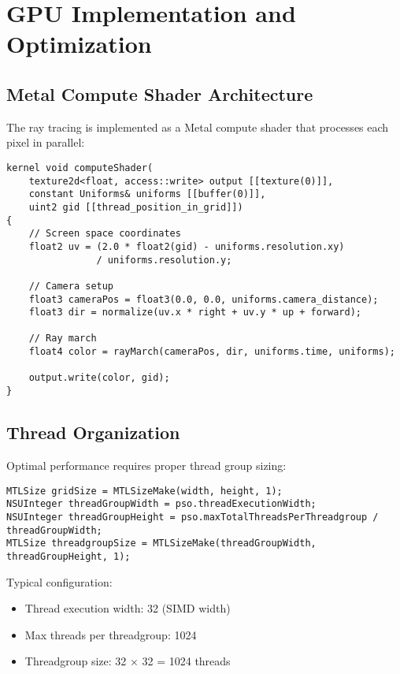 \documentclass[12pt,a4paper]{article}
\theoremstyle{definition}
\theoremstyle{remark}
\begin{document}
\section{GPU Implementation and Optimization}

\subsection{Metal Compute Shader Architecture}

The ray tracing is implemented as a Metal compute shader that processes each pixel in parallel:

\begin{lstlisting}[style=metalstyle, caption=Main compute kernel]
kernel void computeShader(
    texture2d<float, access::write> output [[texture(0)]],
    constant Uniforms& uniforms [[buffer(0)]],
    uint2 gid [[thread_position_in_grid]])
{
    // Screen space coordinates
    float2 uv = (2.0 * float2(gid) - uniforms.resolution.xy) 
                / uniforms.resolution.y;
    
    // Camera setup
    float3 cameraPos = float3(0.0, 0.0, uniforms.camera_distance);
    float3 dir = normalize(uv.x * right + uv.y * up + forward);
    
    // Ray march
    float4 color = rayMarch(cameraPos, dir, uniforms.time, uniforms);
    
    output.write(color, gid);
}
\end{lstlisting}

\subsection{Thread Organization}

Optimal performance requires proper thread group sizing:

\begin{lstlisting}[style=metalstyle, caption=Thread group configuration]
MTLSize gridSize = MTLSizeMake(width, height, 1);
NSUInteger threadGroupWidth = pso.threadExecutionWidth;
NSUInteger threadGroupHeight = pso.maxTotalThreadsPerThreadgroup / threadGroupWidth;
MTLSize threadgroupSize = MTLSizeMake(threadGroupWidth, threadGroupHeight, 1);
\end{lstlisting}

Typical configuration:
\begin{itemize}
    \item Thread execution width: 32 (SIMD width)
    \item Max threads per threadgroup: 1024
    \item Threadgroup size: 32 × 32 = 1024 threads
\end{itemize}
\end{document}
